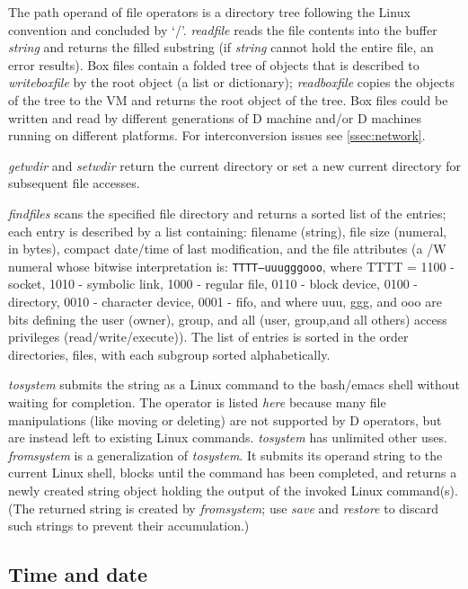 The path operand of file operators is a directory tree following the Linux convention and concluded by `/'. \emph{readfile} reads the file contents into the buffer \emph{string} and returns the filled substring (if \emph{string} cannot hold the entire file, an error results). Box files contain a folded tree of objects that is described to \emph{writeboxfile} by the root object (a list or dictionary); \emph{readboxfile} copies the objects of the tree to the VM and returns the root object of the tree. Box files could be written and read by different generations of D machine and/or D machines running on different platforms. For interconversion issues see \ref{ssec:network}.

\emph{getwdir} and \emph{setwdir} return the current directory or set a new current directory for subsequent file accesses.

\emph{findfiles} scans the specified file directory and returns a sorted list of the entries; each entry is described by a list containing: filename (string), file size (numeral, in bytes), compact date/time of last modification, and the file attributes (a /W numeral whose bitwise interpretation is: \texttt {TTTT---uuugggooo}, where TTTT = 1100 - socket, 1010 - symbolic link, 1000 - regular file, 0110 - block device, 0100 - directory, 0010 - character device, 0001 - fifo, and where uuu, ggg, and ooo are bits defining the user (owner), group, and all (user, group,and all others) access privileges (read/write/execute)). The list of entries is sorted in the order directories, files, with each subgroup sorted alphabetically.

\emph{tosystem} submits the string as a Linux command to the bash/emacs shell without waiting for completion. The operator is listed \emph{here} because many file manipulations (like moving or deleting) are not supported by D operators, but are instead left to existing Linux commands. \emph{tosystem} has unlimited other uses. \emph{fromsystem} is a generalization of \emph{tosystem}. It submits its operand string to the current Linux shell, blocks until the command has been completed, and returns a newly created string object holding the output of the invoked Linux command(s). (The returned string is created by \emph{fromsystem}; use \emph{save} and \emph{restore} to discard such strings to prevent their accumulation.)

\subsection{Time and date}

